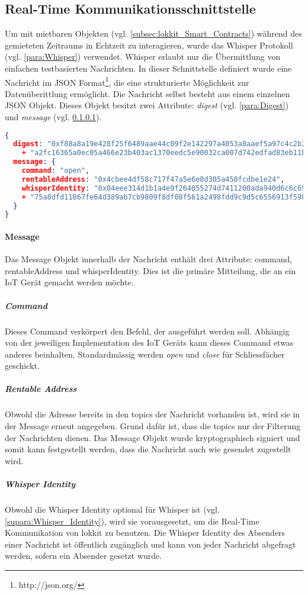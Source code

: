 \subsection{Real-Time Kommunikationsschnittstelle}
\label{subsec:Real_Time_Kommunikationsschnittstelle}
Um mit mietbaren Objekten (vgl. \ref{subsec:lokkit_Smart_Contracts}) während des gemieteten Zeitraums in Echtzeit zu interagieren, wurde das Whisper Protokoll (vgl. \ref{para:Whisper}) verwendet. Whisper erlaubt nur die Übermittlung von einfachen testbasierten Nachrichten. In dieser Schnittstelle definiert wurde eine Nachricht im JSON Format\footnote{http://json.org/}, die eine strukturierte Möglichkeit zur Datenüberittlung ermöglicht.
Die Nachricht selbst besteht aus einem einzelnen JSON Objekt. Dieses Objekt besitzt zwei Attribute: \emph{digest} (vgl. \ref{para:Digest}) und \emph{message} (vgl. \ref{para:Message}).

\begin{lstlisting}[language=json,caption={Beispiel einer Real-Time Nachricht via Whisper Protokoll}]
{
  digest: "0xf88a8a19e428f25f6489aae44c09f2e142297a4053a8aaef5a97c4c2b246c89477"
    + "a2fc16365a0ec05a466e23b403ac1370eedc5e90032ca007d742edfad83eb11b",
  message: {
    command: "open",
    rentableAddress: "0x4cbee4df58c717f47a5e6e8d305a450fcdbe1e24",
    whisperIdentity: "0x04eee314d1b1a4e9f264055274d7411200ada940d6c6c698d53bf40b41ff0f5277"
    + "75a8dfd11867fe64d389ab7cb9809f8df08f561a2498fdd9c9d5c6556913f598"
  }
}
\end{lstlisting}

\paragraph{Message}
\label{para:Message}
Das Message Objekt innerhalb der Nachricht enthält drei Attribute: command, rentableAddress und whisperIdentity. Dies ist die primäre Mitteilung, die an ein IoT Gerät gemacht werden möchte.
\subparagraph{Command}
\label{subpara:Command}
Dieses Command verkörpert den Befehl, der ausgeführt werden soll. Abhängig von der jeweiligen Implementation des IoT Geräts kann dieses Command etwas anderes beinhalten. Standardmässig werden \emph{open} und \emph{close} für Schliessfächer geschickt.
\subparagraph{Rentable Address}
Obwohl die Adresse bereits in den topics der Nachricht vorhanden ist, wird sie in der Message erneut angegeben. Grund dafür ist, dass die topics nur der Filterung der Nachrichten dienen. Das Message Objekt wurde kryptographisch signiert und somit kann festgestellt werden, dass die Nachricht auch wie gesendet zugestellt wird.
\subparagraph{Whisper Identity}
Obwohl die Whisper Identity optional für Whisper ist (vgl. \ref{supara:Whisper_Identity}), wird sie vorausgesetzt, um die Real-Time Kommunikation von lokkit zu benutzen. Die Whisper Identity des Absenders einer Nachricht ist öffentlich zugänglich und kann von jeder Nachricht abgefragt werden, sofern ein Absender gesetzt wurde.

